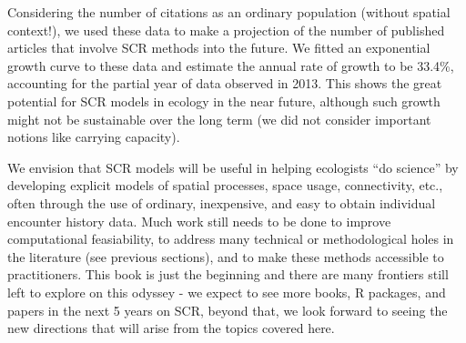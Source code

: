 Considering the number of citations as an ordinary population (without
spatial context!), we used these data to make a projection of the
number of published articles that involve SCR methods into the future.
We fitted an exponential growth curve to these data and estimate the
annual rate of growth to be 33.4\%, accounting for the partial year of
data observed in 2013.  This shows the great potential for SCR models in 
ecology in the near future, although such growth might not be sustainable
over the long term (we did not 
consider important notions like carrying capacity).


We envision that SCR models will be useful in helping
ecologists ``do science'' by developing explicit models of spatial
processes, space usage, connectivity, etc., often through the use of ordinary, 
inexpensive, and
easy to obtain individual encounter history data. Much work still needs to
be done to improve computational feasiability, to address many
technical or methodological holes in the literature (see previous
sections), and to make these methods accessible to practitioners.
This book is just the beginning and there are many frontiers still
left to explore on this odyssey - we expect to see more books, R packages,
and papers in the next 5 years on SCR, beyond that, we look forward to seeing
the new directions that will arise from the topics covered here.  

















